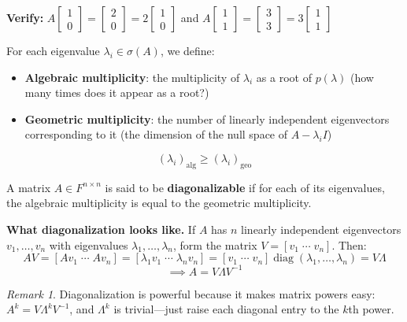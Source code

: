\documentclass[11pt]{article}
\theoremstyle{definition}
\theoremstyle{plain}
\theoremstyle{remark}
\newtheorem{remark}[definition]{Remark}
\DeclareMathOperator{\diag}{diag}
\begin{document}
\begin{workedexample}[title=\textbf{Worked Example: Finding eigenvalues and eigenvectors}]
\textbf{Verify:} $A\begin{bmatrix}1\\0\end{bmatrix} = \begin{bmatrix}2\\0\end{bmatrix} = 2\begin{bmatrix}1\\0\end{bmatrix}$ \checkmark\quad and $A\begin{bmatrix}1\\1\end{bmatrix} = \begin{bmatrix}3\\3\end{bmatrix} = 3\begin{bmatrix}1\\1\end{bmatrix}$ \checkmark
\end{workedexample}

\medskip

For each eigenvalue $\lambda_i \in \sigma(A)$, we define:
\begin{itemize}[nosep]
\item \textbf{Algebraic multiplicity}: the multiplicity of $\lambda_i$ as a root of $p(\lambda)$ (how many times does it appear as a root?)
\item \textbf{Geometric multiplicity}: the number of linearly independent eigenvectors corresponding to it (the dimension of the null space of $A - \lambda_i I$)
\end{itemize}
\[
(\lambda_i)_{\text{alg}} \geq (\lambda_i)_{\text{geo}}
\]

A matrix $A \in F^{n \times n}$ is said to be \textbf{diagonalizable} if for each of its eigenvalues, the algebraic multiplicity is equal to the geometric multiplicity.

\textbf{What diagonalization looks like.} If $A$ has $n$ linearly independent eigenvectors $v_1, \ldots, v_n$ with eigenvalues $\lambda_1, \ldots, \lambda_n$, form the matrix $V = [v_1 \;\cdots\; v_n]$. Then:
\[
AV = [Av_1 \;\cdots\; Av_n] = [\lambda_1 v_1 \;\cdots\; \lambda_n v_n] = [v_1 \;\cdots\; v_n]\diag(\lambda_1, \ldots, \lambda_n) = V\Lambda
\]
\[
\implies \boxed{A = V\Lambda V^{-1}}
\]

\begin{remark}
Diagonalization is powerful because it makes matrix powers easy: $A^k = V\Lambda^k V^{-1}$, and $\Lambda^k$ is trivial---just raise each diagonal entry to the $k$th power.
\end{remark}
\end{document}
